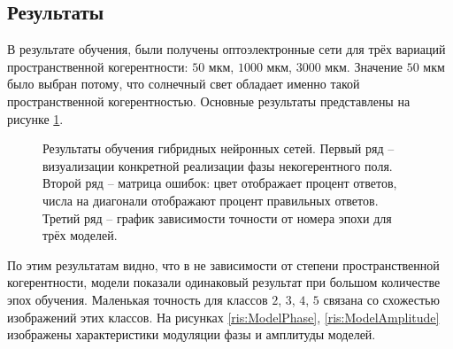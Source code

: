 \subsection{Результаты}
В результате обучения, были получены оптоэлектронные сети для трёх вариаций пространственной когерентности: $50$ мкм, $1000$ мкм, $3000$ мкм. Значение $50$ мкм было выбран потому, что солнечный свет обладает именно такой пространственной когерентностью. Основные результаты представлены на рисунке \ref{ris:Results}.
\begin{figure}[h]
	\caption{Результаты обучения гибридных нейронных сетей. Первый ряд -- визуализации конкретной реализации фазы некогерентного поля. Второй ряд -- матрица ошибок: цвет отображает процент ответов, числа на диагонали отображают процент правильных ответов. Третий ряд -- график зависимости точности от номера эпохи для трёх моделей.}
	\label{ris:Results}
\end{figure}
По этим результатам видно, что в не зависимости от степени пространственной когерентности, модели показали одинаковый результат при большом количестве эпох обучения. Маленькая точность для классов $2$, $3$, $4$, $5$ связана со схожестью изображений этих классов.
На рисунках \ref{ris:ModelPhase}, \ref{ris:ModelAmplitude} изображены характеристики модуляции фазы и амплитуды моделей.
